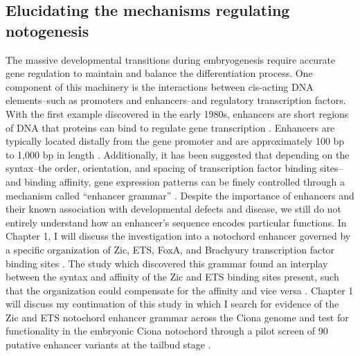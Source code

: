 \begin{dissertationintroduction}
    \section{Elucidating the mechanisms regulating notogenesis}
    The massive developmental transitions during embryogenesis require accurate gene regulation to maintain and balance the differentiation process. One component of this machinery is the interactions between cis-acting DNA elements–such as promoters and enhancers–and regulatory transcription factors. With the first example discovered in the early 1980s, enhancers are short regions of DNA that proteins can bind to regulate gene transcription \cite{khoury1983, kvon2021, levine2010}. Enhancers are typically located distally from the gene promoter and are approximately 100 bp to 1,000 bp in length \cite{khoury1983, levine2010}. Additionally, it has been suggested that depending on the syntax–the order, orientation, and spacing of transcription factor binding sites–and binding affinity, gene expression patterns can be finely controlled through a mechanism called “enhancer grammar” \cite{arnone1997, jindal2021}. Despite the importance of enhancers and their known association with developmental defects and disease, we still do not entirely understand how an enhancer’s sequence encodes particular functions. In Chapter 1, I will discuss the investigation into a notochord enhancer governed by a specific organization of Zic, ETS, FoxA, and Brachyury transcription factor binding sites \cite{farley2016, song2022}. The study which discovered this grammar found an interplay between the syntax and affinity of the Zic and ETS binding sites present, such that the organization could compensate for the affinity and vice versa \cite{farley2016}. Chapter 1 will discuss my continuation of this study in which I search for evidence of the Zic and ETS notochord enhancer grammar across the Ciona genome and test for functionality in the embryonic Ciona notochord through a pilot screen of 90 putative enhancer variants at the tailbud stage \cite{song2022}. 
    

\end{dissertationintroduction}
